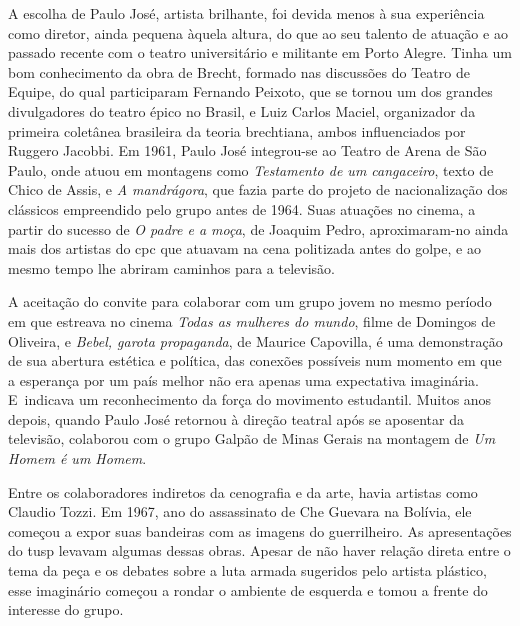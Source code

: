 A escolha de Paulo José, artista brilhante, foi devida menos à sua
experiência como diretor, ainda pequena àquela altura, do que ao seu
talento de atuação e ao passado recente com o teatro universitário e
militante em Porto Alegre. Tinha um bom conhecimento da obra de Brecht,
formado nas discussões do Teatro de Equipe, do qual participaram
Fernando Peixoto, que se tornou um dos grandes divulgadores do teatro
épico no Brasil, e Luiz Carlos Maciel, organizador da primeira coletânea
brasileira da teoria brechtiana, ambos influenciados por Ruggero
Jacobbi. Em 1961, Paulo José integrou-se ao Teatro de Arena de São
Paulo, onde atuou em montagens como {\it Testamento de um cangaceiro},
texto de Chico de Assis, e {\it A mandrágora}, que fazia parte do
projeto de nacionalização dos clássicos empreendido pelo grupo antes de
1964. Suas atuações no cinema, a partir do sucesso de {\it O padre e a
moça}, de Joaquim Pedro, aproximaram-no ainda mais dos artistas do {\sc cpc}
que atuavam na cena politizada antes do golpe, e ao mesmo tempo lhe
abriram caminhos para a televisão.

A aceitação do convite para colaborar com um grupo jovem no mesmo
período em que estreava no cinema {\it Todas as mulheres do mundo},
filme de Domingos de Oliveira, e {\it Bebel, garota propaganda}, de
Maurice Capovilla, é uma demonstração de sua abertura estética e
política, das conexões possíveis num momento em que a esperança por um
país melhor não era apenas uma expectativa imaginária. E~indicava um
reconhecimento da força do movimento estudantil. Muitos anos depois,
quando Paulo José retornou à direção teatral após se aposentar da
televisão, colaborou com o grupo Galpão de Minas Gerais na montagem de
{\it Um Homem é um Homem}.


Entre os colaboradores indiretos da cenografia e da arte, havia artistas
como Claudio Tozzi. Em 1967, ano do assassinato de Che Guevara na
Bolívia, ele começou a expor suas bandeiras com as imagens do
guerrilheiro. As apresentações do {\sc tusp} levavam algumas dessas obras.
Apesar de não haver relação direta entre o tema da peça e os debates
sobre a luta armada sugeridos pelo artista plástico, esse imaginário
começou a rondar o ambiente de esquerda e tomou a frente do interesse do
grupo.

